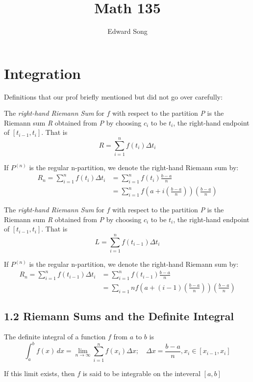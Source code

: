 \documentclass[11pt]{article}
\title{Math 135}
\author{Edward Song}
\theoremstyle{plain}
\theoremstyle{remark}
\theoremstyle{plain}
\begin{document}
\section {Integration}

Definitions that our prof briefly mentioned but did not go over carefully:
\begin{tcolorbox}[colback=green!5!white,colframe=green!75!black,title=Definition: Right-hand Riemann Sum]
    The \emph{right-hand Riemann Sum} for $f$ with respect to the partition \emph{P} is the Riemann sum 
    \emph{R} obtained from \emph{P} by choosing $c_i$ to be $t_i$, the right-hand endpoint of $[t_{i-1}, t_i]$. 
    That is \[R = \sum_{i=1}^{n} f(t_i)\Delta t_i\]

    If $P^{(n)}$ is the regular n-partition, we denote the right-hand Riemann sum by:
    \begin{align*}
        R_n = \sum_{i=1}^{n}f(t_i)\Delta t_i &= \sum_{i=1}^{n}f(t_i)\frac{b-a}{n} \\
        &=\sum_{i=1}^{n}f(a+i(\frac{b-a}{n}))(\frac{b-a}{n})
    \end{align*}
 \end{tcolorbox} 
 
 \begin{tcolorbox}[colback=green!5!white,colframe=green!75!black,title=Definition: Left-hand Riemann Sum]
    The \emph{right-hand Riemann Sum} for $f$ with respect to the partition \emph{P} is the Riemann sum 
    \emph{R} obtained from \emph{P} by choosing $c_i$ to be $t_i$, the right-hand endpoint of $[t_{i-1}, t_i]$. 
    That is \[L = \sum_{i=1}^{n} f(t_{i-1})\Delta t_i\]

    If $P^{(n)}$ is the regular n-partition, we denote the right-hand Riemann sum by:
    \begin{align*}
        R_n = \sum_{i=1}^{n}f(t_{i-1})\Delta t_i &= \sum_{i=1}^{n}f(t_{i-1})\frac{b-a}{n} \\
        &=\sum_{i=1}{n}f(a+(i-1)(\frac{b-a}{n}))(\frac{b-a}{n})
    \end{align*}
 \end{tcolorbox} 



\subsection*{1.2 Riemann Sums and the Definite Integral}

\begin{tcolorbox}[colback=green!5!white,colframe=green!75!black,title=Definition]
   The definite integral of a function $f$ from $a$ to $b$ is \[ \int_{a}^{b} f(x) \,dx = \lim_{n\to \infty}
   \sum_{i=1}^{n} f(x_i)\Delta x; \quad \Delta x = \frac{b-a}{n}, x_i \in [x_{i-1},x_i] \]

    If this limit exists, then $f$ is said to be integrable on the inteveral $[a,b]$
\end{tcolorbox}   
\end{document}
